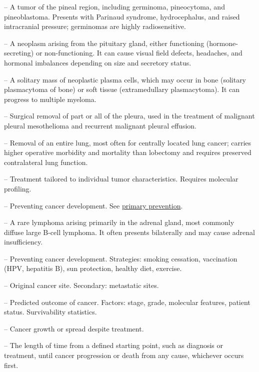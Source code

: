 -- A tumor of the pineal region, including germinoma, pineocytoma, and pineoblastoma. Presents with Parinaud syndrome, hydrocephalus, and raised intracranial pressure; germinomas are highly radiosensitive.

-- A neoplasm arising from the pituitary gland, either functioning (hormone-secreting) or non-functioning. It can cause visual field defects, headaches, and hormonal imbalances depending on size and secretory status.

-- A solitary mass of neoplastic plasma cells, which may occur in bone (solitary plasmacytoma of bone) or soft tissue (extramedullary plasmacytoma). It can progress to multiple myeloma.

-- Surgical removal of part or all of the pleura, used in the treatment of malignant pleural mesothelioma and recurrent malignant pleural effusion.

-- Removal of an entire lung, most often for centrally located lung cancer; carries higher operative morbidity and mortality than lobectomy and requires preserved contralateral lung function.

-- Treatment tailored to individual tumor characteristics. Requires molecular profiling.

-- Preventing cancer development. See \hyperlink{Primary Prevention}{primary prevention}.

-- A rare lymphoma arising primarily in the adrenal gland, most commonly diffuse large B-cell lymphoma. It often presents bilaterally and may cause adrenal insufficiency.

-- Preventing cancer development. Strategies: smoking cessation, vaccination (HPV, hepatitis B), sun protection, healthy diet, exercise.

-- Original cancer site. Secondary: metastatic sites.

-- Predicted outcome of cancer. Factors: stage, grade, molecular features, patient status. Survivability statistics.

-- Cancer growth or spread despite treatment.

-- The length of time from a defined starting point, such as diagnosis or treatment, until cancer progression or death from any cause, whichever occurs first.

